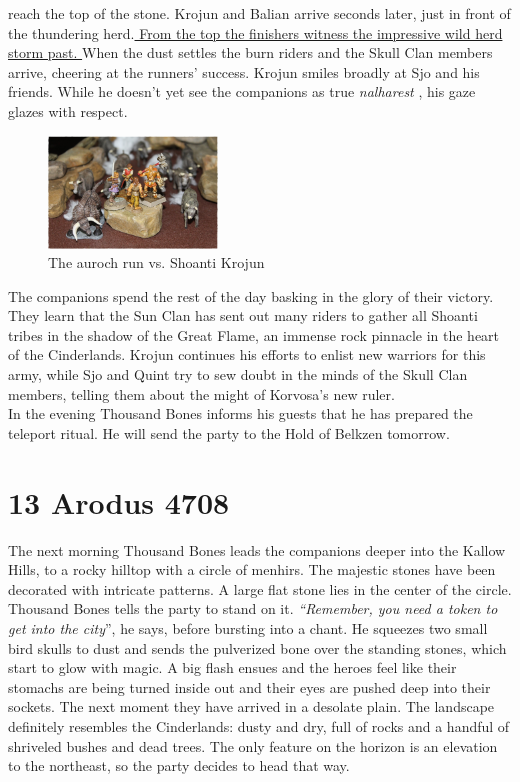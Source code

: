 reach the top of the stone. Krojun and Balian arrive seconds later, just in front of the thundering herd.\hyperref[fig:The-auroch-run-vs-Shoanti-Krojun-586163164]{ From the top the finishers witness the impressive wild herd storm past. } When the dust settles the burn riders and the Skull Clan members arrive, cheering at the runners' success. Krojun smiles broadly at Sjo and his friends. While he doesn't yet see the companions as true  {\itshape nalharest} , his gaze glazes with respect. \\

\begin{figure}[h]
	\centering
	\includegraphics[width=0.4\textwidth]{images/The-auroch-run-vs-Shoanti-Krojun-586163164_mod.jpg}
	\caption{The auroch run vs. Shoanti Krojun}
	\label{fig:The-auroch-run-vs-Shoanti-Krojun-586163164}
\end{figure}

The companions spend the rest of the day basking in the glory of their victory. They learn that the Sun Clan has sent out many riders to gather all Shoanti tribes in the shadow of the Great Flame, an immense rock pinnacle in the heart of the Cinderlands. Krojun continues his efforts to enlist new warriors for this army, while Sjo and Quint try to sew doubt in the minds of the Skull Clan members, telling them about the might of Korvosa's new ruler.\\

In the evening Thousand Bones informs his guests that he has prepared the teleport ritual. He will send the party to the Hold of Belkzen tomorrow.\\

\section{13 Arodus 4708}

The next morning Thousand Bones leads the companions deeper into the Kallow Hills, to a rocky hilltop with a circle of menhirs. The majestic stones have been decorated with intricate patterns. A large flat stone lies in the center of the circle. Thousand Bones tells the party to stand on it. {\itshape``Remember, you need a token to get into the city}'', he says, before bursting into a chant. He squeezes two small bird skulls to dust and sends the pulverized bone over the standing stones, which start to glow with magic. A big flash ensues and the heroes feel like their stomachs are being turned inside out and their eyes are pushed deep into their sockets. The next moment they have arrived in a desolate plain. The landscape definitely resembles the Cinderlands: dusty and dry, full of rocks and a handful of shriveled bushes and dead trees. The only feature on the horizon is an elevation to the northeast, so the party decides to head that way.\\

